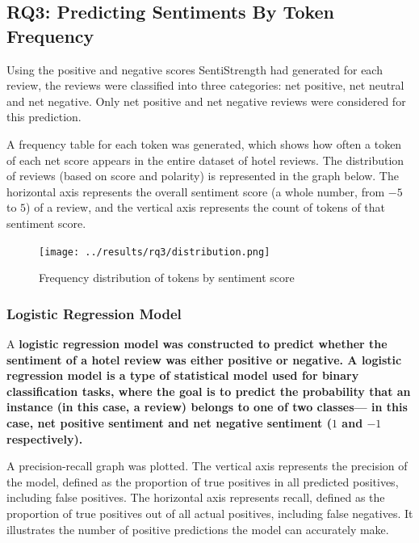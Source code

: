 \documentclass[12pt,bibliography=totocnumbered]{scrartcl}
\begin{document}
{\pagebreak

\subsection{RQ3: Predicting Sentiments By Token Frequency}
Using the positive and negative scores SentiStrength had generated for
each review, the reviews were classified into three categories: net positive,
net neutral and net negative. Only net positive and net negative reviews were
considered for this prediction.

A frequency table for each token was generated, which shows
how often a token of each net score appears in the entire dataset
of hotel reviews. The distribution of reviews (based on score and
polarity) is represented in the graph below. The horizontal axis represents
the overall sentiment score (a whole number, from $-5$ to $5$) of a review,
and the vertical axis represents the count of tokens of that sentiment score.

\begin{figure}[htpb]
	\begin{center}
		\texttt{[image: ../results/rq3/distribution.png]}
	\end{center}
	\caption{Frequency distribution of tokens by sentiment score}
	\label{fig:hist}
\end{figure}

\subsubsection{Logistic Regression Model}
A \bf{logistic regression model} was constructed to predict whether the sentiment
of a hotel review was either positive or negative. A logistic regression model
is a type of statistical model used for binary classification tasks, where the goal
is to predict the probability that an instance (in this case, a review) belongs to one of two classes---
in this case, net positive sentiment and net negative sentiment ($1$ and $-1$ respectively).

A precision-recall graph was plotted.
The vertical axis represents the precision of the model,
defined as the proportion of true positives in all predicted positives, including false positives.
The horizontal axis represents recall, defined as the proportion of true positives
out of all actual positives, including false negatives. It illustrates the number of positive
predictions the model can accurately make.

}
\end{document}
